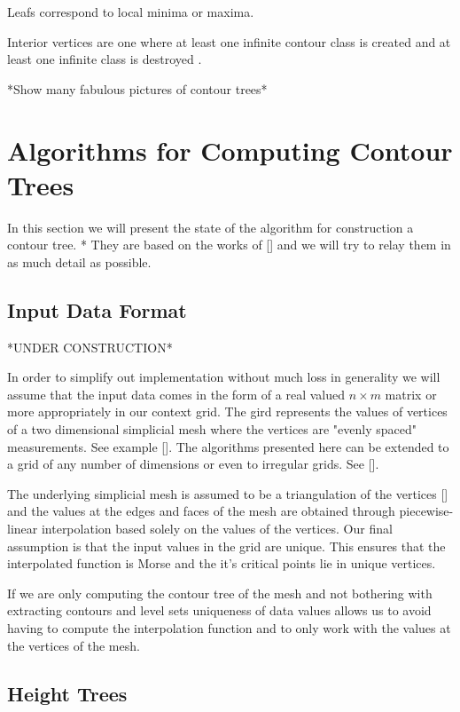 Leafs correspond to local minima or maxima.

Interior vertices are one where at least one infinite contour class is created and at least one infinite class is destroyed \cite{hamish-masters}.

*Show many fabulous pictures of contour trees*


\section{Algorithms for Computing Contour Trees}

In this section we will present the state of the algorithm for construction a contour tree. * They are based on the works of [] and we will try to relay them in as much detail as possible.

\subsection{Input Data Format}

*UNDER CONSTRUCTION*

In order to simplify out implementation without much loss in generality we will assume that the input data comes in the form of a real valued $n \times m$ matrix or more appropriately in our context grid. The gird represents the values of vertices of a two dimensional simplicial mesh where the vertices are "evenly spaced" measurements. See example []. The algorithms presented here can be extended to a grid of any number of dimensions or even to irregular grids. See []. 

The underlying simplicial mesh is assumed to be a triangulation of the vertices [] and the values at the edges and faces of the mesh are obtained through piecewise-linear interpolation based solely on the values of the vertices. Our final assumption is that the input values in the grid are unique. This ensures that the interpolated function is Morse and the it's critical points lie in unique vertices.

If we are only computing the contour tree of the mesh and not bothering with extracting contours and level sets uniqueness of data values allows us to avoid having to compute the interpolation function and to only work with the values at the vertices of the mesh.

\subsection{Height Trees}

